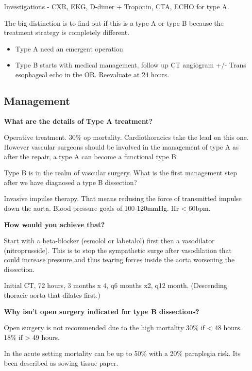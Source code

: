 \documentclass[
]{book}
\begin{document}
Investigations - CXR, EKG, D-dimer + Troponin, CTA, ECHO for type A.

The big distinction is to find out if this is a type A or type B because
the treatment strategy is completely different.

\begin{itemize}
\item
  Type A need an emergent operation
\item
  Type B starts with medical management, follow up CT angiogram +/-
  Trans esophageal echo in the OR. Reevaluate at 24 hours.
\end{itemize}

\hypertarget{management-27}{%
\subsection{Management}\label{management-27}}

\textbf{What are the details of Type A treatment?}

Operative treatment. 30\% op mortality. Cardiothoracics take the lead on
this one. However vascular surgeons should be involved in the management
of type A as after the repair, a type A can become a functional type B.

Type B is in the realm of vascular surgery. What is the first management
step after we have diagnosed a type B dissection?

Invasive impulse therapy. That means redusing the force of transmitted
impulse down the aorta. Blood pressure goals of 100-120mmHg. Hr \textless{}
60bpm.

\textbf{How would you achieve that?}

Start with a beta-blocker (esmolol or labetalol) first then a
vasodilator (nitroprusside). This is to stop the sympathetic surge after
vasodilation that could increase pressure and thus tearing forces inside
the aorta worsening the dissection.

Initial CT, 72 hours, 3 months x 4, q6 months x2, q12 month. (Descending
thoracic aorta that dilates first.)

\textbf{Why isn't open surgery indicated for type B dissections?}

Open surgery is not recommended due to the high mortality 30\% if \textless{} 48
hours. 18\% if \textgreater{} 49 hours.

In the acute setting mortality can be up to 50\% with a 20\% paraplegia
risk. Its been described as sowing tissue paper.
\end{document}
